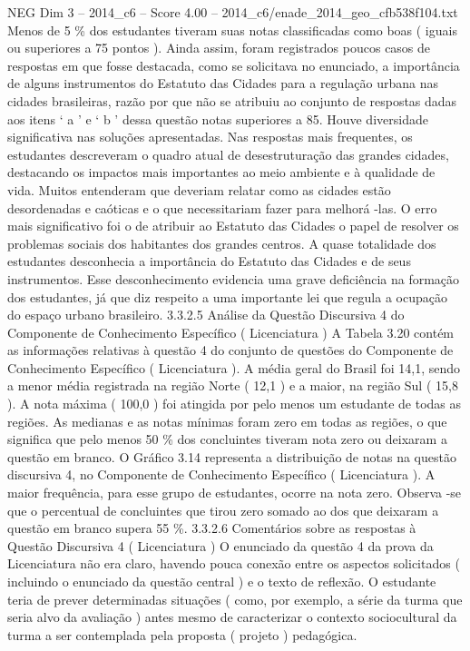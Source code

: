 \begin{textsample}{NEG Dim 3 – 2014\_c6 – Score 4.00 – 2014\_c6/enade\_2014\_geo\_cfb538f104.txt}
Menos de 5 \% dos estudantes tiveram suas notas classificadas como boas ( iguais ou superiores a 75 pontos ).
Ainda assim, foram registrados poucos casos de respostas em que fosse destacada, como se solicitava no enunciado, a importância de alguns instrumentos do Estatuto das Cidades para a regulação urbana nas cidades brasileiras, razão por que não se atribuiu ao conjunto de respostas dadas aos itens ‘ a ’ e ‘ b ’ dessa questão notas superiores a 85.
Houve diversidade significativa nas soluções apresentadas.
Nas respostas mais frequentes, os estudantes descreveram o quadro atual de desestruturação das grandes cidades, destacando os impactos mais importantes ao meio ambiente e à qualidade de vida.
Muitos entenderam que deveriam relatar como as cidades estão desordenadas e caóticas e o que necessitariam fazer para melhorá -las.
O erro mais significativo foi o de atribuir ao Estatuto das Cidades o papel de resolver os problemas sociais dos habitantes dos grandes centros.
A quase totalidade dos estudantes desconhecia a importância do Estatuto das Cidades e de seus instrumentos.
Esse desconhecimento evidencia uma grave deficiência na formação dos estudantes, já que diz respeito a uma importante lei que regula a ocupação do espaço urbano brasileiro. 3.3.2.5 Análise da Questão Discursiva 4 do Componente de Conhecimento Específico ( Licenciatura ) A Tabela 3.20 contém as informações relativas à questão 4 do conjunto de questões do Componente de Conhecimento Específico ( Licenciatura ).
A média geral do Brasil foi 14,1, sendo a menor média registrada na região Norte ( 12,1 ) e a maior, na região Sul ( 15,8 ).
A nota máxima ( 100,0 ) foi atingida por pelo menos um estudante de todas as regiões.
As medianas e as notas mínimas foram zero em todas as regiões, o que significa que pelo menos 50 \% dos concluintes tiveram nota zero ou deixaram a questão em branco.
O Gráfico 3.14 representa a distribuição de notas na questão discursiva 4, no Componente de Conhecimento Específico ( Licenciatura ).
A maior frequência, para esse grupo de estudantes, ocorre na nota zero.
Observa -se que o percentual de concluintes que tirou zero somado ao dos que deixaram a questão em branco supera 55 \%. 3.3.2.6 Comentários sobre as respostas à Questão Discursiva 4 ( Licenciatura ) O enunciado da questão 4 da prova da Licenciatura não era claro, havendo pouca conexão entre os aspectos solicitados ( incluindo o enunciado da questão central ) e o texto de reflexão.
O estudante teria de prever determinadas situações ( como, por exemplo, a série da turma que seria alvo da avaliação ) antes mesmo de caracterizar o contexto sociocultural da turma a ser contemplada pela proposta ( projeto ) pedagógica.

\end{textsample}

